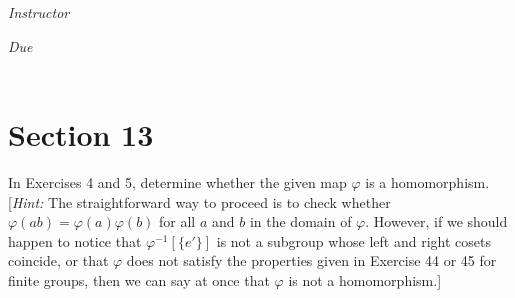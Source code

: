 \documentclass[12pt, oneside]{book}
\begin{document}
\begin{titlepage}
\begin{center}
\begin{large}
            \vspace*{1\baselineskip}

            \textit{Instructor} \\[1ex] %
            \professor

            \vspace*{1\baselineskip}

            \textit{Due}\\[1ex]
            {\scshape  \finaldate} \\[0.3\baselineskip] %

            \thispagestyle{empty}

        \end{large}
    \end{center}
\end{titlepage}
\section*{Section 13}


In Exercises 4 and 5, determine whether the given map \(\varphi\) is a homomorphism. [\textit{Hint:} The straightforward way to proceed is to check whether \(\varphi(ab) = \varphi(a)\varphi(b)\) for all \(a\) and \(b\) in the domain of \(\varphi\). However, if we should happen to notice that \(\varphi^{-1}[\{ e' \}]\) is not a subgroup whose left and right cosets coincide, or that \(\varphi\) does not satisfy the properties given in Exercise 44 or 45 for finite groups, then we can say at once that \(\varphi\) is not a homomorphism.]
\end{document}
